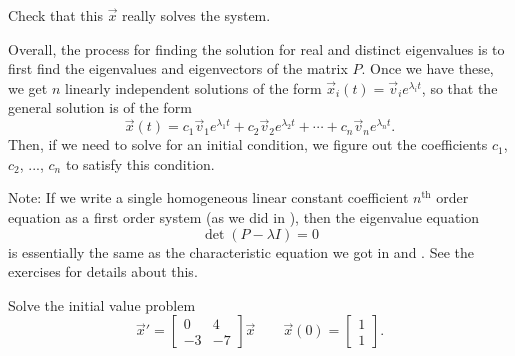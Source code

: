 \begin{exercise}
Check that this $\vec{x}$ really solves the system.
\end{exercise}

Overall, the process for finding the solution for real and distinct eigenvalues is to first find the eigenvalues and eigenvectors of the matrix $P$. Once we have these, we get $n$ linearly independent solutions of the form $\vec{x}_i(t) = \vec{v}_ie^{\lambda_i t}$, so that the general solution is of the form
\[ \vec{x}(t) = c_1\vec{v}_1e^{\lambda_1 t} + c_2\vec{v}_2e^{\lambda_2 t} + \cdots + c_n\vec{v}_ne^{\lambda_n t}. \] Then, if we need to solve for an initial condition, we figure out the coefficients $c_1$, $c_2$, ..., $c_n$ to satisfy this condition.

Note: If we write a single homogeneous linear constant coefficient $n^{\text{th}}$
order equation as a first order system (as we did in ),
then the eigenvalue equation
\begin{equation*}
\det(P - \lambda I) = 0
\end{equation*}
is essentially the same as the characteristic equation we got in
 and
. See the exercises for details about this.

\begin{example}
Solve the initial value problem
\begin{equation*}
\vec{x}' = \begin{bmatrix} 0 & 4 \\ -3 & -7 \end{bmatrix}\vec{x} \qquad \vec{x}(0) = \begin{bmatrix} 1 \\ 1 \end{bmatrix}.
\end{equation*}
\end{example}

